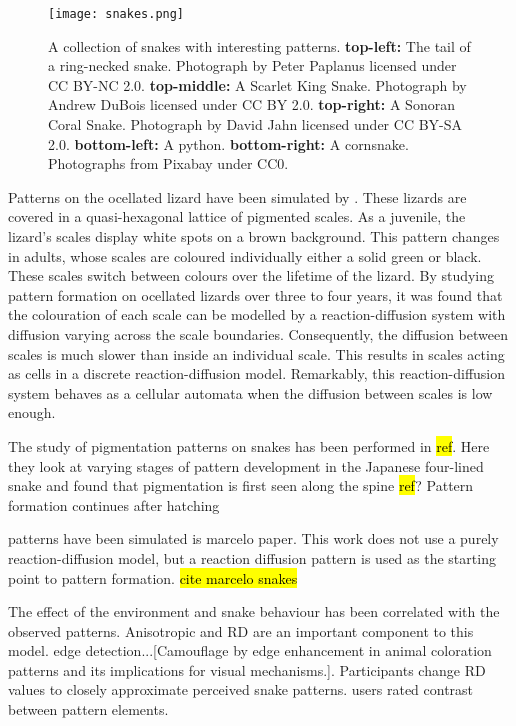 
\begin{figure}[hb]
	\centering
	\texttt{[image: snakes.png]}
	\caption{A collection of snakes with interesting patterns. \textbf{top-left:} The tail of a ring-necked snake. Photograph by Peter Paplanus licensed under CC BY-NC 2.0. \textbf{top-middle:} A Scarlet King Snake. Photograph by Andrew DuBois licensed under CC BY 2.0. \textbf{top-right:} A Sonoran Coral Snake. Photograph by David Jahn licensed under CC BY-SA 2.0. \textbf{bottom-left:} A python. \textbf{bottom-right:} A cornsnake. Photographs from Pixabay under CC0.}
	\label{fig:realSnakePatterns}
\end{figure}

Patterns on the ocellated lizard have been simulated by \cite{manukyan2017}. These lizards are covered in a quasi-hexagonal lattice of pigmented scales. As a juvenile, the lizard's scales display white spots on a brown background. This pattern changes in adults, whose scales are coloured individually either a solid green or black. These scales switch between colours over the lifetime of the lizard. By studying pattern formation on ocellated lizards over three to four years, it was found that the colouration of each scale can be modelled by a reaction-diffusion system with diffusion varying across the scale boundaries. Consequently, the diffusion between scales is much slower than inside an individual scale. This results in scales acting as cells in a discrete reaction-diffusion model. Remarkably, this reaction-diffusion system behaves as a cellular automata when the diffusion between scales is low enough.

The study of pigmentation patterns on snakes has been performed in \hl{ref}. Here they look at varying stages of pattern development in the Japanese four-lined snake and found that pigmentation is first seen along the spine \hl{ref}? Pattern formation continues after hatching

patterns have been simulated is marcelo paper. This work does not use a purely reaction-diffusion model, but a reaction diffusion pattern is used as the starting point to pattern formation. \hl{cite marcelo snakes}

The effect of the environment and snake behaviour has been correlated with the observed patterns. Anisotropic and RD are an important component to this model. edge detection...[Camouflage by edge enhancement in animal coloration patterns and its implications for visual mechanisms.]. Participants change RD values to closely approximate perceived snake patterns. users rated contrast between pattern elements.

